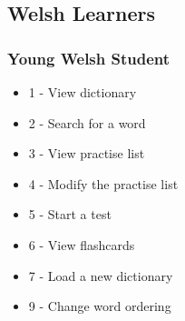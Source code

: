 \documentclass{project}
\begin{document}
\subsection{Welsh Learners}
\subsubsection{Young Welsh Student}
\begin{itemize}
	\item 1 - View dictionary 
	\item 2 - Search for a word
	\item 3 - View practise list
	\item 4 - Modify the practise list
	\item 5 - Start a test
	\item 6 - View flashcards
	\item 7 - Load a new dictionary
	\item 9 - Change word ordering
\end{itemize}
\end{document}
